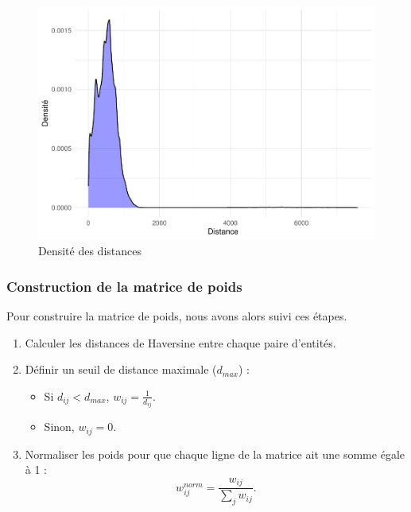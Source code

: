 \documentclass[
]{article}
\providecommand{\tightlist}{%
  \setlength{\itemsep}{0pt}\setlength{\parskip}{0pt}}
\begin{document}
\begin{figure}

{\centering \includegraphics{4_Analyse_Descriptive_files/figure-latex/unnamed-chunk-15-1} 

}

\caption{Densité des distances}\label{fig:unnamed-chunk-15}
\end{figure}

\subsubsection{Construction de la matrice de
poids}\label{construction-de-la-matrice-de-poids}

\hfill\break
Pour construire la matrice de poids, nous avons alors suivi ces
étapes.\\

\begin{enumerate}
\def\labelenumi{\arabic{enumi}.}
\tightlist
\item
  Calculer les distances de Haversine entre chaque paire d'entités.
\item
  Définir un seuil de distance maximale (\(d_{max}\)) :

  \begin{itemize}
  \tightlist
  \item
    Si \(d_{ij} < d_{max}\), \(w_{ij} = \frac{1}{d_{ij}}\).
  \item
    Sinon, \(w_{ij} = 0\).
  \end{itemize}
\item
  Normaliser les poids pour que chaque ligne de la matrice ait une somme
  égale à 1 : \[
   w_{ij}^{norm} = \frac{w_{ij}}{\sum_{j} w_{ij}}.
  \]
\end{enumerate}
\end{document}
